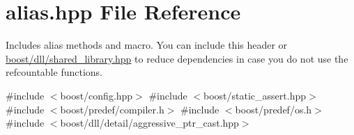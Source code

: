 \hypertarget{a00200}{}\section{alias.\+hpp File Reference}
\label{a00200}


Includes alias methods and macro. You can include this header or \hyperlink{a00269}{boost/dll/shared\+\_\+library.\+hpp} to reduce dependencies in case you do not use the refcountable functions.  


{\ttfamily \#include $<$boost/config.\+hpp$>$}\newline
{\ttfamily \#include $<$boost/static\+\_\+assert.\+hpp$>$}\newline
{\ttfamily \#include $<$boost/predef/compiler.\+h$>$}\newline
{\ttfamily \#include $<$boost/predef/os.\+h$>$}\newline
{\ttfamily \#include $<$boost/dll/detail/aggressive\+\_\+ptr\+\_\+cast.\+hpp$>$}\newline

